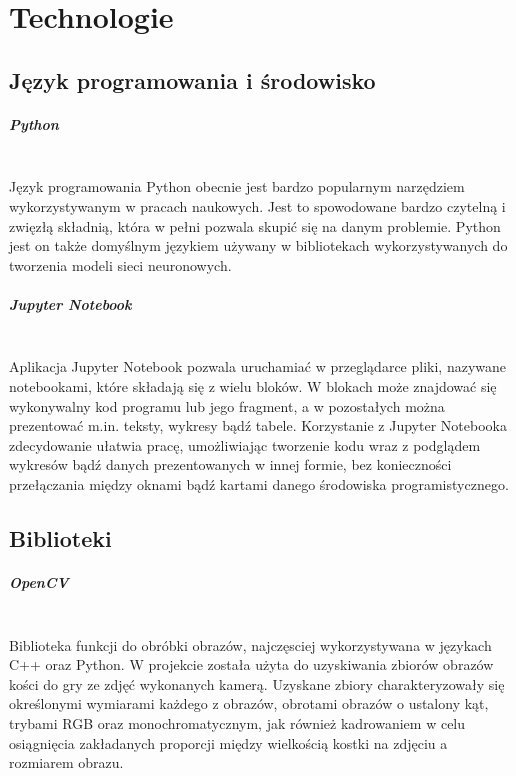 
\chapter{Technologie}
\section{Język programowania i środowisko}

\paragraph{Python} \mbox{}\\
Język programowania Python obecnie jest bardzo popularnym narzędziem wykorzystywanym
w pracach naukowych. Jest to spowodowane bardzo czytelną i zwięzłą składnią,
która w pełni pozwala skupić się na danym problemie. Python jest on także domyślnym
językiem używany w bibliotekach wykorzystywanych do tworzenia modeli sieci neuronowych.

\paragraph{Jupyter Notebook} \mbox{}\\
Aplikacja Jupyter Notebook pozwala uruchamiać w przeglądarce pliki, nazywane notebookami,
które składają się z wielu bloków. W blokach może znajdować się wykonywalny kod programu
lub jego fragment, a w pozostałych można prezentować m.in. teksty, wykresy bądź tabele.
Korzystanie z Jupyter Notebooka zdecydowanie ułatwia pracę, umożliwiając tworzenie
kodu wraz z podglądem wykresów bądź danych prezentowanych w innej formie, bez
konieczności przełączania między oknami bądź kartami danego środowiska programistycznego.

\section{Biblioteki}

\paragraph{OpenCV} \mbox{}\\
Biblioteka funkcji do obróbki obrazów, najczęsciej wykorzystywana w językach C++
oraz Python. W projekcie została użyta do uzyskiwania zbiorów obrazów kości do gry
ze zdjęć wykonanych kamerą. Uzyskane zbiory charakteryzowały się określonymi
wymiarami każdego z obrazów, obrotami obrazów o ustalony kąt, trybami RGB
oraz monochromatycznym, jak również kadrowaniem w celu osiągnięcia zakładanych
proporcji między wielkością kostki na zdjęciu a rozmiarem obrazu.

